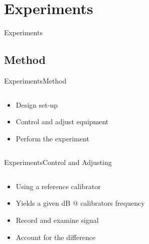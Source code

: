 \section{Experiments}
\begin{frame}{Experiments}
\end{frame}

\subsection{Method}
\begin{frame}{Experiments}{Method}		
	\begin{columns}
		\begin{column}{0.5\textwidth}
			\begin{itemize}
				\item Design set-up
				\item Control and adjust equipment
				\item Perform the experiment
			\end{itemize}	
		\end{column}
		\begin{column}{0.5\textwidth} 
		\end{column}
	\end{columns}
\end{frame}

\begin{frame}{Experiments}{Control and Adjusting}		
	\begin{columns}
		\begin{column}{0.5\textwidth}
			\begin{itemize}
				\item Using a reference calibrator
				\item Yields a given dB @ calibrators frequency
				\item Record and examine signal
				\item Account for the difference 
			\end{itemize}	
		\end{column}	
		\begin{column}{0.5\textwidth} 
		\end{column}
	\end{columns}
\end{frame}

